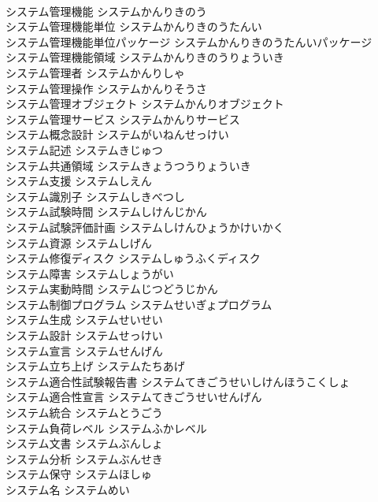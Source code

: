 \documentclass[8pt]{extreport}
\begin{document}
\begin{CJK}{UTF8}{min}
\\	システム管理機能	システムかんりきのう	
\\	システム管理機能単位	システムかんりきのうたんい	
\\	システム管理機能単位パッケージ	システムかんりきのうたんいパッケージ	
\\	システム管理機能領域	システムかんりきのうりょういき	
\\	システム管理者	システムかんりしゃ	
\\	システム管理操作	システムかんりそうさ	
\\	システム管理オブジェクト	システムかんりオブジェクト	
\\	システム管理サービス	システムかんりサービス	
\\	システム概念設計	システムがいねんせっけい	
\\	システム記述	システムきじゅつ	
\\	システム共通領域	システムきょうつうりょういき	
\\	システム支援	システムしえん	
\\	システム識別子	システムしきべつし	
\\	システム試験時間	システムしけんじかん	
\\	システム試験評価計画	システムしけんひょうかけいかく	
\\	システム資源	システムしげん	
\\	システム修復ディスク	システムしゅうふくディスク	
\\	システム障害	システムしょうがい	
\\	システム実動時間	システムじつどうじかん	
\\	システム制御プログラム	システムせいぎょプログラム	
\\	システム生成	システムせいせい	
\\	システム設計	システムせっけい	
\\	システム宣言	システムせんげん	
\\	システム立ち上げ	システムたちあげ	
\\	システム適合性試験報告書	システムてきごうせいしけんほうこくしょ	
\\	システム適合性宣言	システムてきごうせいせんげん	
\\	システム統合	システムとうごう	
\\	システム負荷レベル	システムふかレベル	
\\	システム文書	システムぶんしょ	
\\	システム分析	システムぶんせき	
\\	システム保守	システムほしゅ	
\\	システム名	システムめい	

\end{CJK}
\end{document}
